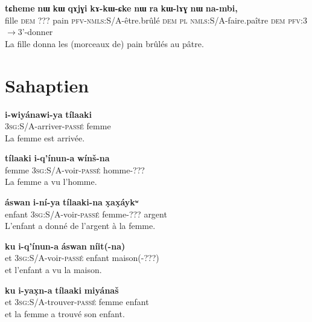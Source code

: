 \documentclass[oldfontcommands,twoside,a4paper,12pt]{article}
\newcommand{\ipa}[1]{{\phon\textbf{#1}}}
\begin{document}
 \begin{exe}
\ex 
\gll
\ipa{tɕheme}  	\ipa{nɯ}  	\ipa{kɯ}  	\ipa{qɤjɣi}  	\ipa{kɤ-kɯ-ɕke}  	\ipa{nɯ}  	\ipa{ra}  	\ipa{kɯ-lɤɣ}  	\ipa{nɯ}  	\ipa{na-mbi,}  \\
fille \textsc{dem} ??? pain \textsc{pfv-nmls}:S/A-être.brûlé \textsc{dem} \textsc{pl} \textsc{nmls}:S/A-faire.paître \textsc{dem} \textsc{pfv}:3$\rightarrow$3'-donner \\
\glt La fille donna les (morceaux de) pain brûlés au pâtre.
\end{exe}


\section{Sahaptien}

 \begin{exe}
\ex 
\gll
\ipa{i-wiyánawi-ya}  	\ipa{tílaaki}  \\
\textsc{3sg}:S/A-arriver-\textsc{passé} femme \\
\glt La femme est arrivée.
\end{exe}

 \begin{exe}
\ex 
\gll
\ipa{tílaaki}  	\ipa{i-q'ínun-a}  	\ipa{wínš-na}   \\
		femme \textsc{3sg}:S/A-voir-\textsc{passé} homme-??? \\
\glt La femme a vu l'homme.
\end{exe}

 \begin{exe}
\ex 
\gll
 \ipa{áswan}    	\ipa{i-ní-ya}  \ipa{tílaaki-na} 	\ipa{x̣ax̣áykʷ}   \\
		enfant \textsc{3sg}:S/A-voir-\textsc{passé} femme-??? argent \\
\glt L'enfant a donné de l'argent à la femme.
\end{exe}


 \begin{exe}
\ex 
\gll
\ipa{ku}  	\ipa{i-q'ínun-a}  \ipa{áswan}  	\ipa{níit(-na)}   \\
		et \textsc{3sg}:S/A-voir-\textsc{passé} enfant maison(-???) \\
\glt  et l'enfant a vu la maison.
\end{exe}

 \begin{exe}
\ex 
\gll
\ipa{ku}  	\ipa{i-yax̣n-a}  \ipa{tílaaki}  	\ipa{miyánaš}   \\
		et \textsc{3sg}:S/A-trouver-\textsc{passé} femme enfant \\
\glt  et la femme a trouvé son enfant.
\end{exe}
\end{document}

